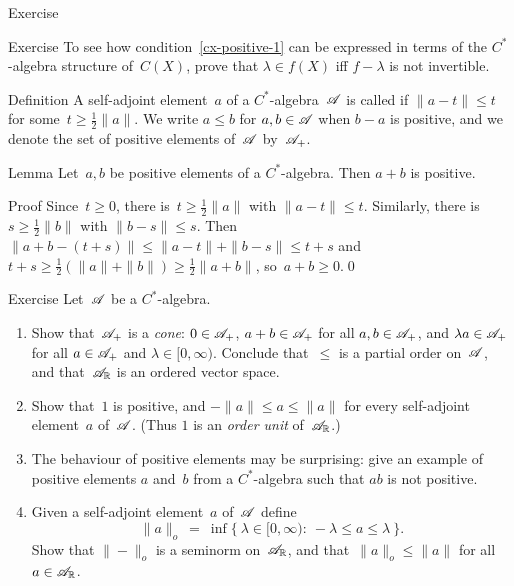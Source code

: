 \documentclass[a]{subfiles}
\begin{document}
\begin{parsec}
\begin{point}[cx-positive]{Exercise}
\begin{enumerate}
\end{enumerate}
\begin{point}{Exercise}%
To see how condition~\ref{cx-positive-1}
can be expressed in terms of the $C^*$-algebra structure of~$C(X)$,
prove that  $\lambda\in f(X)$ iff $f-\lambda$
is not invertible.
\end{point}
\end{point}
\begin{point}{Definition}%
A self-adjoint element~$a$ of a $C^*$-algebra~$\mathscr{A}$ is called
 if $\|a-t\|\leq t$
for some~$t\geq \frac{1}{2}\|a\|$.
We write $a\leq b$ for $a,b\in\mathscr{A}$ when $b-a$ is positive,
and we denote the set of positive elements of~$\mathscr{A}$
by~$\mathscr{A}_{+}$.
\end{point}
\begin{point}{Lemma}%
Let~$a,b$ be positive elements of a $C^*$-algebra.
Then $a+b$ is positive.
\begin{point}{Proof}
Since~$t\geq 0$,
there is~$t\geq \frac{1}{2}\|a\|$ with $\|a-t\|\leq t$.
Similarly, there is~$s\geq \frac{1}{2}\|b\|$
with $\|b-s\|\leq s$.
Then $\|a+b-(t+s)\|\leq \|a-t\|+\|b-s\|\leq t+s$
and $t+s\geq \frac{1}{2}(\|a\|+\|b\|) \geq \frac{1}{2}\|a+b\|$,
so~$a+b\geq 0$.\qed
\end{point}
\end{point}
\begin{point}{Exercise}%
Let~$\mathscr{A}$ be a $C^*$-algebra.
\begin{enumerate}
\item
Show that~$\mathscr{A}_{+}$ is a \emph{cone}:
$0\in \mathscr{A}_{+}$,
$a+b\in \mathscr{A}_{+}$ for all $a,b\in\mathscr{A}_{+}$,
and
$\lambda a\in \mathscr{A}_{+}$  
for all $a\in \mathscr{A}_{+}$ and $\lambda\in [0,\infty)$.
Conclude that~$\leq$ is a partial order on~$\mathscr{A}$,
and that~$\mathscr{A}_{\mathbb{R}}$ is an ordered vector space.
\item
Show that~$1$ is positive, and  $-\|a\|\leq a \leq \|a\|$
for every self-adjoint element~$a$ of~$\mathscr{A}$.
(Thus $1$ is an \emph{order unit} of~$\mathscr{A}_{\mathbb{R}}$.)
\item
The behaviour of positive elements may be surprising:
give an example of positive elements $a$ and~$b$
from a $C^*$-algebra
such that $ab$ is not positive.
\item
Given a self-adjoint element~$a$ of~$\mathscr{A}$ define
\begin{equation*}
\|a\|_o \ = \ \inf\{\ \lambda\in[0,\infty)\colon \ 
-\lambda\leq a\leq \lambda\ \}.
\end{equation*}
Show that $\|-\|_o$ is a seminorm on~$\mathscr{A}_{\mathbb{R}}$,
and that~$\|a\|_o\leq \|a\|$
for all~$a\in\mathscr{A}_{\mathbb{R}}$.


\end{enumerate}
\end{point}
\end{parsec}
\end{document}
